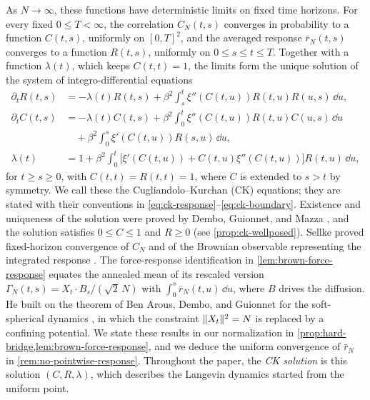 As $N\to\infty$, these functions have deterministic limits on fixed time horizons. For every fixed $0\le T<\infty$, the correlation $C_N(t,s)$ converges in probability to a function $C(t,s)$, uniformly on $[0,T]^2$, and the averaged response $\bar r_N(t,s)$ converges to a function $R(t,s)$, uniformly on $0\le s\le t\le T$. Together with a function $\lambda(t)$, which keeps $C(t,t)=1$, the limits form the unique solution of the system of integro-differential equations
\begin{align*}
 \partial_tR(t,s)&=-\lambda(t)R(t,s)
 +\beta^2\int_s^t\xi''(C(t,u))R(t,u)R(u,s)\,\dd u,\\
 \partial_tC(t,s)&=-\lambda(t)C(t,s)
 +\beta^2\int_0^t\xi''(C(t,u))R(t,u)C(u,s)\,\dd u\\
 &\hspace{1em}+\beta^2\int_0^s\xi'(C(t,u))R(s,u)\,\dd u,\\
 \lambda(t)&=1+\beta^2\int_0^t
 \bigl[\xi'(C(t,u))+C(t,u)\xi''(C(t,u))\bigr]R(t,u)\,\dd u,
\end{align*}
for $t\ge s\ge0$, with $C(t,t)=R(t,t)=1$, where $C$ is extended to $s>t$ by symmetry. We call these the Cugliandolo--Kurchan (CK) equations; they are stated with their conventions in \eqref{eq:ck-response}--\eqref{eq:ck-boundary}. Existence and uniqueness of the solution were proved by Dembo, Guionnet, and Mazza \cite[Proposition~1.1]{dgm2007}, and the solution satisfies $0\le C\le1$ and $R\ge0$ (see \cref{prop:ck-wellposed}). Sellke proved fixed-horizon convergence of $C_N$ and of the Brownian observable representing the integrated response \cite[Theorem~4.3]{sellke2024}. The force-response identification in \cref{lem:brown-force-response} equates the annealed mean of its rescaled version $\Gamma_N(t,s)=X_t\cdot B_s/(\sqrt2\,N)$ with $\int_0^s\bar r_N(t,u)\,\dd u$, where $B$ drives the diffusion. He built on the theorem of Ben Arous, Dembo, and Guionnet for the soft-spherical dynamics \cite[Theorem~1.2]{bag2006}, in which the constraint $\lVert X_t\rVert^2=N$ is replaced by a confining potential. We state these results in our normalization in \cref{prop:hard-bridge,lem:brown-force-response}, and we deduce the uniform convergence of $\bar r_N$ in \cref{rem:no-pointwise-response}. Throughout the paper, the \emph{CK solution} is this solution $(C,R,\lambda)$, which describes the Langevin dynamics started from the uniform point.

